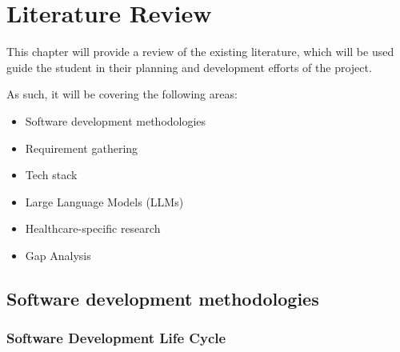 \chapter{Literature Review}

This chapter will provide a review of the existing literature, which will be used guide the student in their planning and development efforts of the project.

\noindent As such, it will be covering the following areas:
\begin{itemize}
    \item Software development methodologies
    \item Requirement gathering
    \item Tech stack
    \item Large Language Models (LLMs)
    \item Healthcare-specific research
    \item Gap Analysis
\end{itemize}

\section{Software development methodologies}

\subsection{Software Development Life Cycle}

